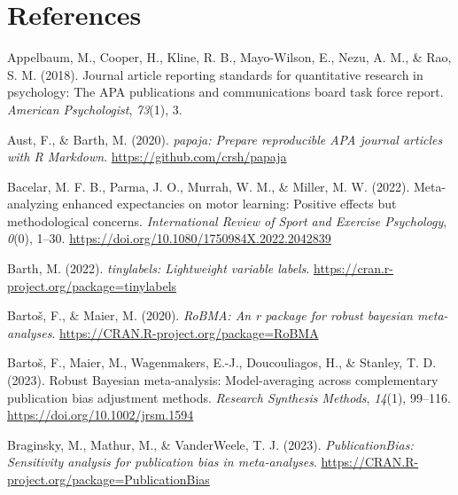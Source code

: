 \documentclass[
  man, donotrepeattitle,floatsintext]{apa7}
\newlength{\cslhangindent}
\newlength{\cslentryspacingunit} %
\newenvironment{CSLReferences}[2] %
 {%
  \setlength{\parindent}{0pt}
  \ifodd #1
  \let\oldpar\par
  \def\par{\hangindent=\cslhangindent\oldpar}
  \fi
  \setlength{\parskip}{#2\cslentryspacingunit}
 }%
 {}
\begin{document}
\newpage

\hypertarget{references}{%
\section{References}\label{references}}

\vspace{2ex}

\hypertarget{refs}{}
\begin{CSLReferences}{1}{0}
\leavevmode{}%
Appelbaum, M., Cooper, H., Kline, R. B., Mayo-Wilson, E., Nezu, A. M., \& Rao, S. M. (2018). Journal article reporting standards for quantitative research in psychology: The APA publications and communications board task force report. \emph{American Psychologist}, \emph{73}(1), 3.

\leavevmode{}%
Aust, F., \& Barth, M. (2020). \emph{{papaja}: {Prepare} reproducible {APA} journal articles with {R Markdown}}. \url{https://github.com/crsh/papaja}

\leavevmode{}%
Bacelar, M. F. B., Parma, J. O., Murrah, W. M., \& Miller, M. W. (2022). Meta-analyzing enhanced expectancies on motor learning: Positive effects but methodological concerns. \emph{International Review of Sport and Exercise Psychology}, \emph{0}(0), 1--30. \url{https://doi.org/10.1080/1750984X.2022.2042839}

\leavevmode{}%
Barth, M. (2022). \emph{{tinylabels}: Lightweight variable labels}. \url{https://cran.r-project.org/package=tinylabels}

\leavevmode{}%
Bartoš, F., \& Maier, M. (2020). \emph{RoBMA: An r package for robust bayesian meta-analyses}. \url{https://CRAN.R-project.org/package=RoBMA}

\leavevmode{}%
Bartoš, F., Maier, M., Wagenmakers, E.-J., Doucouliagos, H., \& Stanley, T. D. (2023). Robust {Bayesian} meta-analysis: {Model-averaging} across complementary publication bias adjustment methods. \emph{Research Synthesis Methods}, \emph{14}(1), 99--116. \url{https://doi.org/10.1002/jrsm.1594}

\leavevmode{}%
Braginsky, M., Mathur, M., \& VanderWeele, T. J. (2023). \emph{PublicationBias: Sensitivity analysis for publication bias in meta-analyses}. \url{https://CRAN.R-project.org/package=PublicationBias}


\end{CSLReferences}
\end{document}
